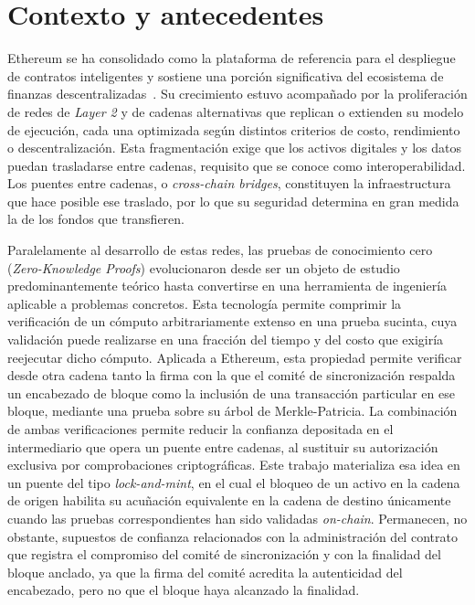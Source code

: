 \section{Contexto y antecedentes}

Ethereum se ha consolidado como la plataforma de referencia para el despliegue de contratos
inteligentes y sostiene una porción significativa del ecosistema de finanzas
descentralizadas~\cite{buterin2014ethereum}. Su crecimiento estuvo acompañado por la
proliferación de redes de \textit{Layer 2} y de cadenas alternativas que replican o extienden su
modelo de ejecución, cada una optimizada según distintos criterios de costo, rendimiento o
descentralización. Esta fragmentación exige que los activos digitales y los datos puedan
trasladarse entre cadenas, requisito que se conoce como interoperabilidad. Los puentes entre
cadenas, o \textit{cross-chain bridges}, constituyen la infraestructura que hace posible ese
traslado, por lo que su seguridad determina en gran medida la de los fondos que transfieren.

Paralelamente al desarrollo de estas redes, las pruebas de conocimiento cero
(\textit{Zero-Knowledge Proofs}) evolucionaron desde ser un objeto de estudio predominantemente
teórico hasta convertirse en una herramienta de ingeniería aplicable a problemas concretos. Esta
tecnología permite comprimir la verificación de un cómputo arbitrariamente extenso en una prueba
sucinta, cuya validación puede realizarse en una fracción del tiempo y del costo que exigiría
reejecutar dicho cómputo. Aplicada a Ethereum, esta propiedad permite verificar desde otra cadena
tanto la firma con la que el comité de sincronización respalda un encabezado de bloque como la
inclusión de una transacción particular en ese bloque, mediante una prueba sobre su árbol de
Merkle-Patricia. La combinación de ambas verificaciones permite reducir la confianza depositada en
el intermediario que opera un puente entre cadenas, al sustituir su autorización exclusiva por
comprobaciones criptográficas. Este trabajo materializa esa idea en un puente del tipo
\textit{lock-and-mint}, en el cual el bloqueo de un activo en la cadena de origen habilita su
acuñación equivalente en la cadena de destino únicamente cuando las pruebas correspondientes han
sido validadas \textit{on-chain}. Permanecen, no obstante, supuestos de confianza relacionados con
la administración del contrato que registra el compromiso del comité de sincronización y con la
finalidad del bloque anclado, ya que la firma del comité acredita la autenticidad del encabezado,
pero no que el bloque haya alcanzado la finalidad.

